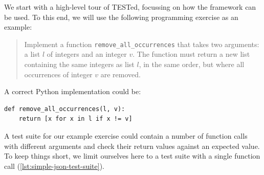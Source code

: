 \documentclass[../main]{subfiles}
\begin{document}
We start with a high-level tour of TESTed, focussing on how the framework can be used.
To this end, we will use the following programming exercise as an example:

\begin{quote}
    Implement a function \texttt{remove\_all\_occurrences} that takes two arguments: a list $l$ of integers and an integer $v$.
    The function must return a new list containing the same integers as list $l$, in the same order, but where all occurrences of integer $v$ are removed.
\end{quote}

A correct Python implementation could be:

\begin{verbatim}
def remove_all_occurrences(l, v):
    return [x for x in l if x != v]
\end{verbatim}

A test suite for our example exercise could contain a number of function calls with different arguments and check their return values against an expected value.
To keep things short, we limit ourselves here to a test suite with a single function call (\cref{lst:simple-json-test-suite}).

\end{document}
